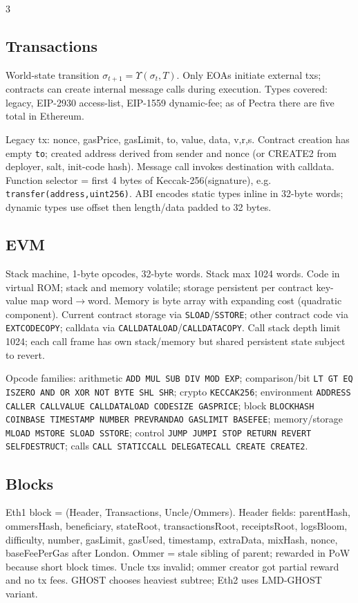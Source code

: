 \documentclass[8pt]{extarticle}
\begin{document}
\begin{multicols*}{3}
\subsection{Transactions}
World-state transition $\sigma_{t+1}=\Upsilon(\sigma_t,T)$. Only EOAs initiate external txs; contracts can create internal message calls during execution. Types covered: legacy, EIP-2930 access-list, EIP-1559 dynamic-fee; as of Pectra there are five total in Ethereum.

Legacy tx: nonce, gasPrice, gasLimit, to, value, data, v,r,s. Contract creation has empty \texttt{to}; created address derived from sender and nonce (or CREATE2 from deployer, salt, init-code hash). Message call invokes destination with calldata. Function selector = first 4 bytes of Keccak-256(signature), e.g. \texttt{transfer(address,uint256)}. ABI encodes static types inline in 32-byte words; dynamic types use offset then length/data padded to 32 bytes.

\subsection{EVM}
Stack machine, 1-byte opcodes, 32-byte words. Stack max 1024 words. Code in virtual ROM; stack and memory volatile; storage persistent per contract key-value map word$\to$word. Memory is byte array with expanding cost (quadratic component). Current contract storage via \texttt{SLOAD}/\texttt{SSTORE}; other contract code via \texttt{EXTCODECOPY}; calldata via \texttt{CALLDATALOAD}/\texttt{CALLDATACOPY}. Call stack depth limit 1024; each call frame has own stack/memory but shared persistent state subject to revert.

Opcode families: arithmetic \texttt{ADD MUL SUB DIV MOD EXP}; comparison/bit \texttt{LT GT EQ ISZERO AND OR XOR NOT BYTE SHL SHR}; crypto \texttt{KECCAK256}; environment \texttt{ADDRESS CALLER CALLVALUE CALLDATALOAD CODESIZE GASPRICE}; block \texttt{BLOCKHASH COINBASE TIMESTAMP NUMBER PREVRANDAO GASLIMIT BASEFEE}; memory/storage \texttt{MLOAD MSTORE SLOAD SSTORE}; control \texttt{JUMP JUMPI STOP RETURN REVERT SELFDESTRUCT}; calls \texttt{CALL STATICCALL DELEGATECALL CREATE CREATE2}.

\subsection{Blocks}
Eth1 block = (Header, Transactions, Uncle/Ommers). Header fields: parentHash, ommersHash, beneficiary, stateRoot, transactionsRoot, receiptsRoot, logsBloom, difficulty, number, gasLimit, gasUsed, timestamp, extraData, mixHash, nonce, baseFeePerGas after London. Ommer = stale sibling of parent; rewarded in PoW because short block times. Uncle txs invalid; ommer creator got partial reward and no tx fees. GHOST chooses heaviest subtree; Eth2 uses LMD-GHOST variant.


\end{multicols*}
\end{document}
